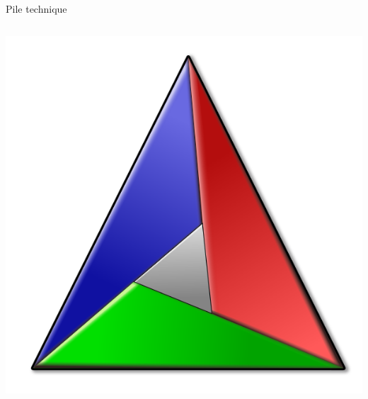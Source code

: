 \begin{frame}{Pile technique}
\begin{columns}
\begin{column}{0.5\textwidth}
\begin{center}
            
            \includegraphics[scale=0.1]{./images/cmake-logo.png}
        \end{center}
    \end{column}
\end{columns}
\end{frame}

